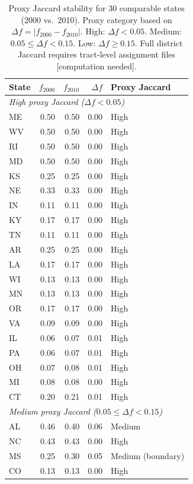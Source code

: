 \begin{table}[h]
\centering
\caption{Proxy Jaccard stability for 30 comparable states (2000 vs.\ 2010).
  Proxy category based on $\Delta f = |f_{2000} - f_{2010}|$.
  High: $\Delta f < 0.05$.
  Medium: $0.05 \leq \Delta f < 0.15$.
  Low: $\Delta f \geq 0.15$.
  Full district Jaccard requires tract-level assignment files [computation needed].}
\label{tab:proxy-jaccard}
\small
\begin{tabular}{l r r r l}
\toprule
State & $f_{2000}$ & $f_{2010}$ & $\Delta f$ & Proxy Jaccard \\
\midrule
\multicolumn{5}{l}{\textit{High proxy Jaccard ($\Delta f < 0.05$)}} \\
ME  & 0.50 & 0.50 & 0.00 & High \\
WV  & 0.50 & 0.50 & 0.00 & High \\
RI  & 0.50 & 0.50 & 0.00 & High \\
MD  & 0.50 & 0.50 & 0.00 & High \\
KS  & 0.25 & 0.25 & 0.00 & High \\
NE  & 0.33 & 0.33 & 0.00 & High \\
IN  & 0.11 & 0.11 & 0.00 & High \\
KY  & 0.17 & 0.17 & 0.00 & High \\
TN  & 0.11 & 0.11 & 0.00 & High \\
AR  & 0.25 & 0.25 & 0.00 & High \\
LA  & 0.17 & 0.17 & 0.00 & High \\
WI  & 0.13 & 0.13 & 0.00 & High \\
MN  & 0.13 & 0.13 & 0.00 & High \\
OR  & 0.17 & 0.17 & 0.00 & High \\
VA  & 0.09 & 0.09 & 0.00 & High \\
IL  & 0.06 & 0.07 & 0.01 & High \\
PA  & 0.06 & 0.07 & 0.01 & High \\
OH  & 0.07 & 0.08 & 0.01 & High \\
MI  & 0.08 & 0.08 & 0.00 & High \\
CT  & 0.20 & 0.21 & 0.01 & High \\
\midrule
\multicolumn{5}{l}{\textit{Medium proxy Jaccard ($0.05 \leq \Delta f < 0.15$)}} \\
AL  & 0.46 & 0.40 & 0.06 & Medium \\
NC  & 0.43 & 0.43 & 0.00 & High \\
MS  & 0.25 & 0.30 & 0.05 & Medium (boundary) \\
CO  & 0.13 & 0.13 & 0.00 & High \\

\end{tabular}
\end{table}
